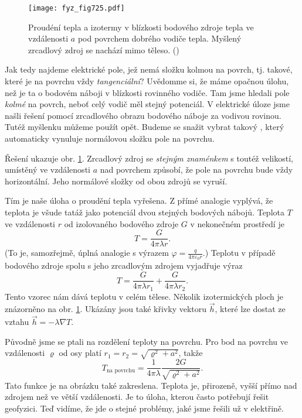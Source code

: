     \begin{figure}[ht!] %
      \centering
      \texttt{[image: fyz\_fig725.pdf]}
      \caption{Proudéní tepla a izotermy v blízkosti bodového zdroje tepla ve vzdálenosti \(a\) pod
        povrchem dobrého vodiče tepla. Myšlený zrcadlový zdroj se nachází mimo těleso.
        (\cite[s.~210]{Feynman02})}
      \label{fyz:fig725}
    \end{figure}

    Jak tedy najdeme elektrické pole, jež nemá složku kolmou na povrch, tj. takové, které je na
    povrchu vždy \emph{tangenciální}? Uvědomme si, že máme opačnou úlohu, než je ta o bodovém náboji
    v blízkosti rovinného vodiče. Tam jsme hledali pole \emph{kolmé} na povrch, neboť celý vodič měl
    stejný potenciál. V elektrické úloze jsme našli řešení pomocí zrcadlového obrazu bodového náboje
    za vodivou rovinou. Tutéž myšlenku můžeme použít opět. Budeme se snažit vybrat takový
    , který automaticky vynuluje normálovou složku pole na povrchu.

    Řešení ukazuje obr. \ref{fyz:fig725}. Zrcadlový zdroj se \emph{stejným znaménkem} s toutéž
    velikostí, umístěný ve vzdálenosti \(a\) nad povrchem způsobí, že pole na povrchu bude vždy
    horizontální. Jeho normálové složky od obou zdrojů se vyruší.

    Tím je naše úloha o proudění tepla vyřešena. Z přímé analogie vyplývá, že teplota je všude tatáž
    jako potenciál dvou stejných bodových nábojů. Teplota \(T\) ve vzdálenosti \(r\) od izolovaného
    bodového zdroje \(G\) v nekonečném prostředí je
    \begin{equation}\label{fyz:eq769}
      T = \dfrac{G}{4\pi\lambda r}.
    \end{equation}
    (To je, samozřejmě, úplná analogie s výrazem \(\varphi = \frac{q}{4\pi\varepsilon_0r}\).)
    Teplotu v případě bodového zdroje spolu s jeho zrcadlovým zdrojem vyjadřuje výraz 
    \begin{equation}\label{fyz:eq770}
      T = \dfrac{G}{4\pi\lambda r_1} + \dfrac{G}{4\pi\lambda r_2}.
    \end{equation}
    Tento vzorec nám dává teplotu v celém tělese. Několik izotermických ploch je znázorněno na obr.
    \ref{fyz:fig725}. Ukázány jsou také křivky vektoru \(\vec{h}\), které lze dostat ze vztahu
    \(\vec{h} = -\lambda\nabla T\).
    
    Původně jsme se ptali na rozdělení teploty na povrchu. Pro bod na povrchu ve vzdálenosti
    \(\varrho\) od osy platí \(r_1= r_2 = \sqrt{\varrho^2 + a^2}\), takže
    \begin{equation}\label{fyz:eq771}
      T_{\text{na povrchu}} = \dfrac{1}{4\pi\lambda}\dfrac{2G}{\sqrt{\varrho^2 + a^2}}.
    \end{equation}
    Tato funkce je na obrázku také zakreslena. Teplota je, přirozeně, vyšší přímo nad zdrojem než 
    ve větší vzdálenosti. Je to úloha, kterou často potřebují řešit geofyzici. Teď vidíme, že jde o
    stejné problémy, jaké jsme řešili už v elektřině.

